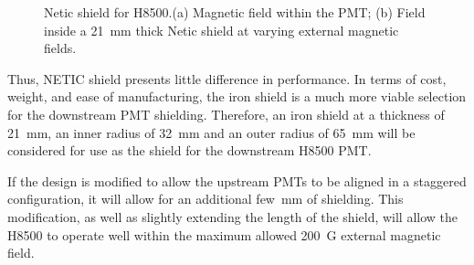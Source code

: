 \documentclass[12pt]{article}
\begin{document}
\begin{figure}[ht]
\centering
{}
\qquad
{}
\caption{\small{Netic shield for H8500.(a) Magnetic field within the PMT;
 (b) Field inside  a 21~mm thick Netic shield at varying external 
magnetic fields. 
}}\label{Upstream_NETIC_21mm}
\end{figure}
Thus, NETIC shield presents little difference
in performance. In terms of cost, weight, and ease of manufacturing, 
the iron shield is a much more viable selection for the downstream PMT shielding. 
Therefore, an iron shield at a thickness
of 21~mm, an inner radius of 32~mm and an outer radius of 65~mm will be 
considered for use as 
the shield for the downstream H8500 PMT.

\clearpage
\newpage


%
%
If the design is modified to allow 
 the upstream PMTs to be aligned in a staggered configuration, 
it will allow for an additional few~mm of shielding. 
This modification, as well as slightly extending the length of
 the shield, will allow the H8500 to operate well within the
 maximum allowed 200~G external magnetic field. 
\end{document}
